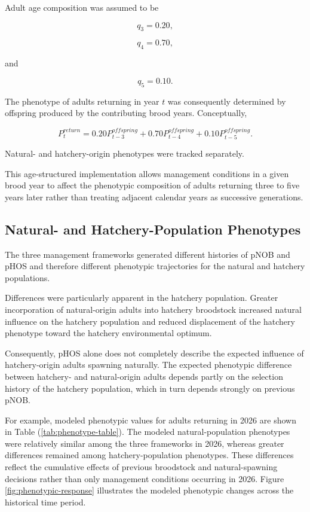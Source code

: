 \documentclass[12pt,letterpaper]{article}
\begin{document}
Adult age composition was assumed to be

\[
q_3 = 0.20,
\]

\[
q_4 = 0.70,
\]

and

\[
q_5 = 0.10.
\]

The phenotype of adults returning in year \(t\) was consequently determined by
offspring produced by the contributing brood years. Conceptually,

\[
P_t^{return} =
0.20P_{t-3}^{offspring} +
0.70P_{t-4}^{offspring} +
0.10P_{t-5}^{offspring}.
\]

Natural- and hatchery-origin phenotypes were tracked separately.

This age-structured implementation allows management conditions in a given
brood year to affect the phenotypic composition of adults returning three to
five years later rather than treating adjacent calendar years as successive
generations.

\subsection{Natural- and Hatchery-Population Phenotypes}\label{natural--and-hatchery-population-phenotypes}

The three management frameworks generated different histories of pNOB and
pHOS and therefore different phenotypic trajectories for the natural and
hatchery populations.

Differences were particularly apparent in the hatchery population. Greater
incorporation of natural-origin adults into hatchery broodstock increased
natural influence on the hatchery population and reduced displacement of the
hatchery phenotype toward the hatchery environmental optimum.

Consequently, pHOS alone does not completely describe the expected influence
of hatchery-origin adults spawning naturally. The expected phenotypic
difference between hatchery- and natural-origin adults depends partly on the
selection history of the hatchery population, which in turn depends strongly
on previous pNOB.

For example, modeled phenotypic values for adults returning in 2026 are shown in Table (\ref{tab:phenotype-table}). The modeled natural-population phenotypes were relatively similar among the three frameworks in 2026, whereas greater differences remained among
hatchery-population phenotypes. These differences reflect the cumulative
effects of previous broodstock and natural-spawning decisions rather than only
management conditions occurring in 2026. Figure \ref{fig:phenotypic-response} illustrates the modeled phenotypic changes across the historical time period.
\end{document}
